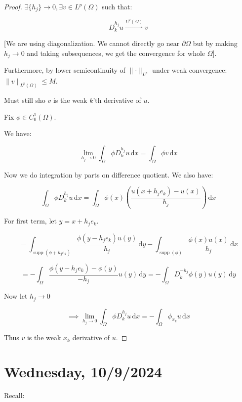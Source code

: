 \documentclass{article}
\theoremstyle{definition}
\begin{document}
\begin{proof}
    \(\exists \{ h_j \} \to 0, \exists v\in L^p(\Omega)\) such that:
    
    \[
        D_k^{h_j} u \overset{L^p(\Omega)}{\rightharpoonup} v
    \]

    [We are using diagonalization. We cannot directly go near \(\partial \Omega\) but by making \(h_j \to 0\) and taking subsequences, we get the convergence for whole \(\Omega\)].

    Furthermore, by lower semicontinuity of \(\lVert \cdot \rVert _{L^p}\) under weak convergence: \(\lVert v \rVert _{L^p(\Omega)}\leq M\). 

    Must still sho \(v\) is the weak \(k\)'th derivative of \(u\).

    Fix \(\phi \in C_0^1(\Omega)\).
    
    We have:

    \[
        \lim_{h_j \to 0} \int_{\Omega} \phi D_k^{h_j} u \,\mathrm{d}x = \int_{\Omega} \phi v \,\mathrm{d}x 
    \]

    Now we do integration by parts on difference quotient. We also have:

    \[
        \int_{\Omega} \phi D_k^{h_j} u \,\mathrm{d}x = \int_{\Omega} \phi (x) \left(\frac{u(x+h_j e_k)-u(x)}{h_j}\right)  \,\mathrm{d}x 
    \]

    For first term, let \(y = x + h_j e_k\). 

    \[
        = \int_{\mathop{\mathrm{supp}}(\phi + h_j e_k)} \frac{\phi(y-h_j e_k)u(y)}{h_j} \,\mathrm{d}y - \int_{\mathop{\mathrm{supp}}(\phi) } \frac{\phi(x)u(x)}{h_j} \,\mathrm{d}x 
    \]

    \[
        = - \int_{\Omega} \frac{\phi(y-h_j e_k)-\phi(y)}{-h_j} u(y) \,\mathrm{d}y = - \int_{\Omega} D_k^{-h_j} \phi (y) u(y) \,\mathrm{d}y 
    \]

    Now let \(h_j \to 0\)
    
    \[
        \implies \lim_{h_j \to 0} \int_{\Omega} \phi D_k^{h_j} u \,\mathrm{d}x = - \int_{\Omega} \phi _{x_k} u \,\mathrm{d}x 
    \]

    Thus \(v\) is the weak \(x_k\) derivative of \(u\).

\end{proof}

\section*{Wednesday, 10/9/2024}

Recall:
\end{document}
